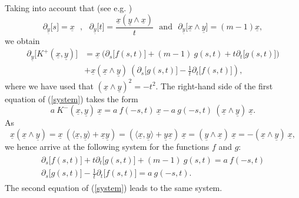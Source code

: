 \documentclass{amsart}
\theoremstyle{remark}
\begin{document}
Taking into account that (see e.g. \cite{FourierBessel})
\begin{displaymath}
\partial_{\underline{y}} \lbrack s \rbrack = {\underline{x}} \ \ \ , \ \ \ \partial_{\underline{y}}\lbrack t \rbrack = \frac{{\underline{x}} ({\underline{y}} \wedge {\underline{x}})}{t} \ \ \ \mathrm{and} \ \ \ \partial_{\underline{y}} \lbrack {\underline{x}} \wedge {\underline{y}} \rbrack = (m-1) {\underline{x}},
\end{displaymath}
we obtain
\begin{align*}
\partial_{\underline{y}} \lbrack K^+({\underline{x}},{\underline{y}}) \rbrack &= {\underline{x}} \ \bigl( \partial_s \lbrack f(s,t) \rbrack + (m-1) \ g(s,t) + t \partial_t \lbrack g(s,t) \rbrack \bigr)\\
&+ {\underline{x}} ({\underline{x}} \wedge {\underline{y}}) \ \left( \partial_s \lbrack g(s,t) \rbrack - \frac{1}{t} \partial_t \lbrack f(s,t) \rbrack \right),
\end{align*}
where we have used that $({\underline{x}} \wedge {\underline{y}})^2 = -t^2$. The right-hand side of the first equation of (\ref{system}) takes the form
\begin{displaymath}
a \ K^-({\underline{x}},{\underline{y}}) \ {\underline{x}} = a \ f(-s,t) \ {\underline{x}} - a \ g(-s,t) \ ({\underline{x}} \wedge {\underline{y}}) \ {\underline{x}}.
\end{displaymath}
As 
\begin{displaymath}
{\underline{x}} ({\underline{x}} \wedge {\underline{y}}) = {\underline{x}} \ (\langle {\underline{x}},{\underline{y}} \rangle + {\underline{x}} {\underline{y}}) = ( \langle {\underline{x}},{\underline{y}} \rangle + {\underline{y}} {\underline{x}}) \ {\underline{x}} = ({\underline{y}} \wedge {\underline{x}}) \ {\underline{x}} = - ({\underline{x}} \wedge {\underline{y}}) \ {\underline{x}},
\end{displaymath}
we hence arrive at the following system for the functions $f$ and $g$:
\begin{align}\label{fg}
\begin{split}
\partial_s \lbrack f(s,t) \rbrack + t \partial_t \lbrack g(s,t)\rbrack + (m-1) \ g(s,t)  =  a \ f(-s,t)\\
\partial_s \lbrack g(s,t) \rbrack - \frac{1}{t} \partial_t \lbrack f(s,t) \rbrack  =  a \ g(-s,t).
\end{split}
\end{align}
The second equation of (\ref{system}) leads to the same system. 
\end{document}
